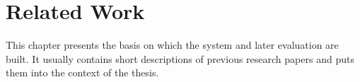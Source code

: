 \chapter{Related Work}\label{ch:related_work}

This chapter presents the basis on which the system and later evaluation are built.
It usually contains short descriptions of previous research papers
and puts them into the context of the thesis.



